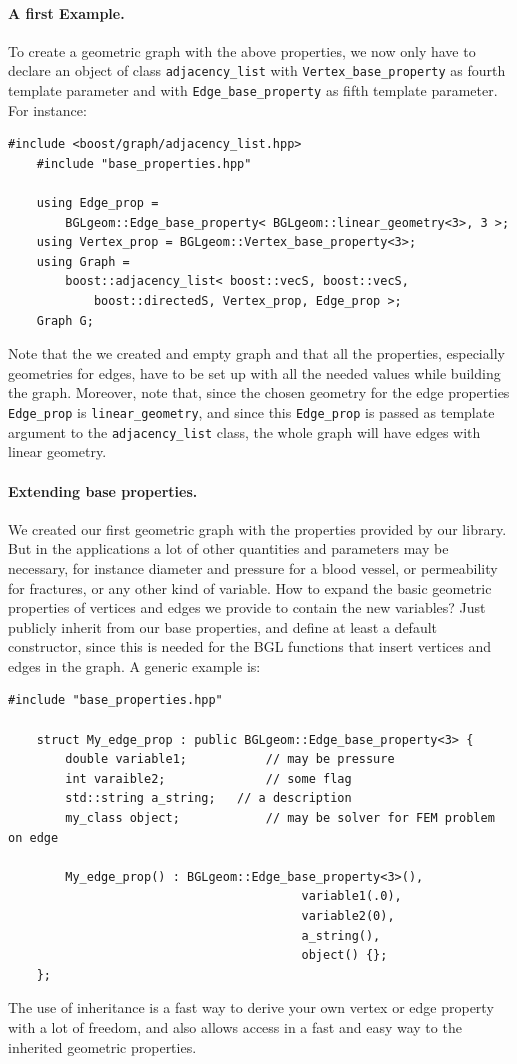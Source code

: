 \documentclass[10pt]{article} %
\newcommand{\classname}[1]{\texttt{#1}}
\begin{document}
	\paragraph{A first Example.} To create a geometric graph with the above properties, we now only have to declare an object of class \classname{adjacency\_list} with \classname{Vertex\_base\_property} as fourth template parameter and with \classname{Edge\_base\_property} as fifth template parameter. For instance:
	\begin{lstlisting}[frame=single]
	#include <boost/graph/adjacency_list.hpp>
	#include "base_properties.hpp"
	
	using Edge_prop = 
		BGLgeom::Edge_base_property< BGLgeom::linear_geometry<3>, 3 >;
	using Vertex_prop = BGLgeom::Vertex_base_property<3>;
	using Graph = 
		boost::adjacency_list< boost::vecS, boost::vecS, 
			boost::directedS, Vertex_prop, Edge_prop >;
	Graph G;
	\end{lstlisting}
	Note that the we created and empty graph and that all the properties, especially geometries for edges, have to be set up with all the needed values while building the graph. Moreover, note that, since the chosen geometry for the edge properties \texttt{Edge\_prop} is \texttt{linear\_geometry}, and since this \texttt{Edge\_prop} is passed as template argument to the \classname{adjacency\_list} class, the whole graph will have edges with linear geometry.
	\paragraph{Extending base properties.} We created our first geometric graph with the properties provided by our library. But in the applications a lot of other quantities and parameters may be necessary, for instance diameter and pressure for a blood vessel, or permeability for fractures, or any other kind of variable. How to expand the basic geometric properties of vertices and edges we provide to contain the new variables? Just publicly inherit from our base properties, and define at least a default constructor, since this is needed for the BGL functions that insert vertices and edges in the graph. A generic example is:
	\begin{lstlisting}[frame=single, name=create_graph]
	#include "base_properties.hpp"
	
	struct My_edge_prop : public BGLgeom::Edge_base_property<3> {
		double variable1;			// may be pressure
		int varaible2;				// some flag
		std::string a_string;	// a description
		my_class object;			// may be solver for FEM problem on edge
	
		My_edge_prop() : BGLgeom::Edge_base_property<3>(),
										 variable1(.0),
										 variable2(0),
										 a_string(),
										 object() {};	
	};
	\end{lstlisting}
	The use of inheritance is a fast way to derive your own vertex or edge property with a lot of freedom, and also allows access in a fast and easy way to the inherited geometric properties.
\end{document}
